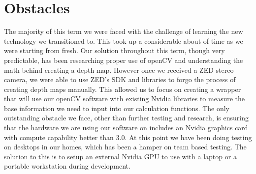 \documentclass[onecolumn, draftclsnofoot,10pt, compsoc]{IEEEtran}
\begin{document}
\section{Obstacles}
\noindent The majority of this term we were faced with the challenge of learning the new technology we transitioned to. This took up a considerable about of time as we were starting from fresh. Our solution throughout this term, though very predictable, has been researching proper use of openCV and understanding the math behind creating a depth map. However once we received a ZED stereo camera, we were able to use ZED's SDK and libraries to forgo the process of creating depth maps manually. This allowed us to focus on creating a wrapper that will use our openCV software with existing Nvidia libraries to measure the base information we need to input into our calculation functions. The only outstanding obstacle we face, other than further testing and research, is ensuring that the hardware we are using our software on includes an Nvidia graphics card with compute capability better than 3.0. At this point we have been doing testing on desktops in our homes, which has been a hamper on team based testing. The solution to this is to setup an external Nvidia GPU to use with a laptop or a portable workstation during development.
\end{document}

